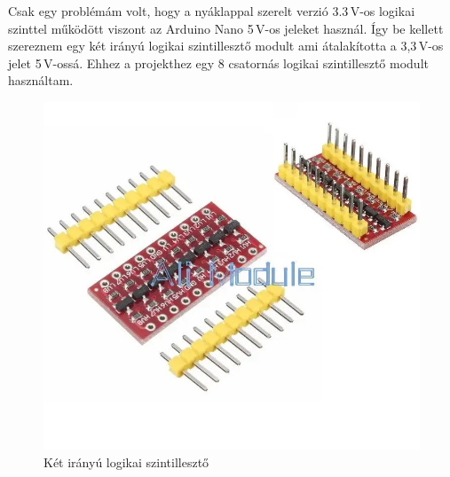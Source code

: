 \documentclass[]{thesis-ekf}
\theoremstyle{definition}
\theoremstyle{remark}
\begin{document}
Csak egy problémám volt, hogy a nyáklappal szerelt verzió 3.3\,V-os logikai szinttel működött viszont az Arduino Nano 5\,V-os jeleket használ.\cite{adns9800_3} Így be kellett szereznem egy két irányú logikai szintillesztő\cite{szintilleszto} modult ami átalakította a 3,3\,V-os  jelet 5\,V-ossá. Ehhez a projekthez egy 8 csatornás logikai szintillesztő modult használtam.

\begin{figure}[th!]
	\centering
	\includegraphics[width=0.4\linewidth]{szintilleszto}
	\caption[Logikai szintillesztő]{Két irányú logikai szintillesztő}
	\label{fig:szintilleszto}
\end{figure}
\end{document}
